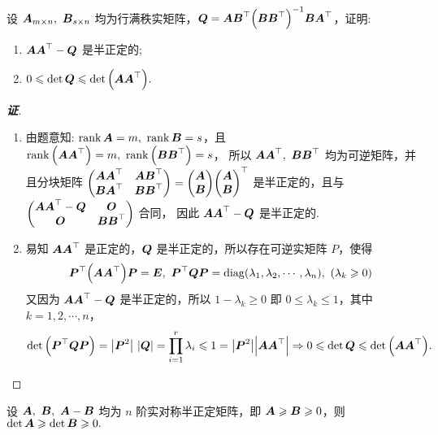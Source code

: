 \begin{example}[1994 华中师范大学]
    设 $\vb*{A}_{m\times n},~\vb*{B}_{s\times n}$ 均为行满秩实矩阵，$\vb*{Q}=\vb*{AB}^\top\qty(\vb*{BB}^\top)^{-1}\vb*{BA}^\top$，证明:
    \begin{enumerate}[label=(\arabic{*})]
        \item $\vb*{AA}^\top-\vb*{Q}$ 是半正定的;
        \item $0\leqslant \det\vb*{Q}\leqslant \det\qty(\vb*{AA}^\top).$
    \end{enumerate}
\end{example}
\begin{proof}[{\songti \textbf{证}}]
    \begin{enumerate}[label=(\arabic{*})]
        \item 由题意知: $\rank\vb*{A}=m,~\rank\vb*{B}=s$，且 $\rank\qty(\vb*{AA}^\top)=m,~\rank\qty(\vb*{BB}^\top)=s$，
              所以 $\vb*{AA}^\top,~\vb*{BB}^\top$ 均为可逆矩阵，并且分块矩阵 $\mqty(\vb*{AA}^\top&\vb*{AB}^\top\\\vb*{BA}^\top&\vb*{BB}^\top)=\mqty(\vb*{A}\\\vb*{B})\mqty(\vb*{A}\\\vb*{B})^\top$ 是半正定的，且与 $\mqty(\vb*{AA}^\top-\vb*{Q}&\vb*{O}\\\vb*{O}&\vb*{BB}^\top)$ 合同，
              因此 $\vb*{AA}^\top-\vb*{Q}$ 是半正定的.
        \item 易知 $\vb*{AA}^\top$ 是正定的，$\vb*{Q}$ 是半正定的，所以存在可逆实矩阵 $P$，使得 $$\vb*{P}^\top\qty(\vb*{AA}^\top)\vb*{P}=\vb*{E},~\vb*{P}^\top\vb*{QP}=\mathrm{diag}(\lambda_1,\lambda_2,\cdots,\lambda_n),~(\lambda_k\geqslant 0)$$
              又因为 $\vb*{AA}^\top-\vb*{Q}$ 是半正定的，所以 $1-\lambda_k\geqslant 0$ 即 $0\leqslant \lambda_k\leqslant 1$，其中 $k=1,2,\cdots,n$，
              $$\det\qty(\vb*{P}^\top\vb*{QP})=\qty|\vb*{P}^2|~\qty|\vb*{Q}|=\prod_{i=1}^{r}\lambda_i\leqslant 1=\qty|\vb*{P}^2|\qty|\vb*{AA}^\top|\Rightarrow 0\leqslant \det\vb*{Q}\leqslant \det\qty(\vb*{AA}^\top).$$
    \end{enumerate}
\end{proof}

\begin{inference}[实对称半正定矩阵的单调性]
    设 $\vb*{A},~\vb*{B},~\vb*{A}-\vb*{B}$ 均为 $n$ 阶实对称半正定矩阵，即 $\vb*{A}\geqslant \vb*{B}\geqslant 0$，则 $\det\vb*{A}\geqslant \det\vb*{B}\geqslant 0.$
\end{inference}
